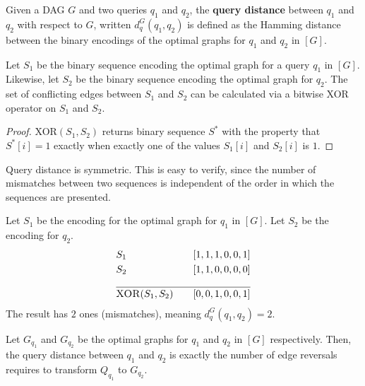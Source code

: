 \begin{definition} Given a DAG $G$ and two queries $q_{1}$ and $q_{2}$, the \textbf{query distance} between $q_{1}$ and $q_{2}$ with respect to $G$, written $d_{q}^{G}(q_{1},q_{2})$ is defined as the Hamming distance between the binary encodings of the optimal graphs for $q_{1}$ and $q_{2}$ in $[G]$.
\end{definition}

\begin{lemma}\label{lemma:hammingdistance}
Let $S_{1}$ be the binary sequence encoding the optimal graph for a query $q_{1}$ in $[G]$. Likewise, let $S_{2}$ be the binary sequence encoding the optimal graph for $q_{2}$. The set of conflicting edges between $S_{1}$ and $S_{2}$ can be calculated via a bitwise \textsc{XOR} operator on $S_{1}$ and $S_{2}$.
\end{lemma}

\begin{proof} \textsc{XOR}$(S_{1}, S_{2})$ returns  binary sequence $S^{*}$ with the property that $S^{*}[i] = 1$ exactly when exactly one of the values $S_{1}[i]$ and $S_{2}[i]$ is $1$. 
\end{proof}

\begin{remark}
Query distance is symmetric. This is easy to verify, since the number of mismatches between two sequences is independent of the order in which the sequences are presented. 
\end{remark}

\begin{example}
Let $S_{1}$ be the encoding for the optimal graph for $q_{1}$ in $[G]$. Let $S_{2}$ be the encoding for $q_{2}$.
\begin{align*}
& S_{1} & \quad  [1,1,1,0,0,1]\\ 
& S_{2} & \quad  [1,1,0,0,0,0]\\ 
 \cline{1-3} \\[-2em]
& \textsc{XOR}(S_{1}, S_{2}) & \quad [0,0,1,0,0,1] 
\end{align*}
The result has $2$ ones (mismatches), meaning $d_{q}^{G}(q_{1},q_{2}) = 2$. 
\end{example}

\begin{lemma}
Let $G_{q_{1}}$ and $G_{q_{2}}$ be the optimal graphs for $q_{1}$ and $q_{2}$ in $[G]$ respectively. Then, the query distance between $q_{1}$ and $q_{2}$ is exactly the number of edge reversals requires to transform $Q_{q_{1}}$ to $G_{q_{2}}$.
\end{lemma}


